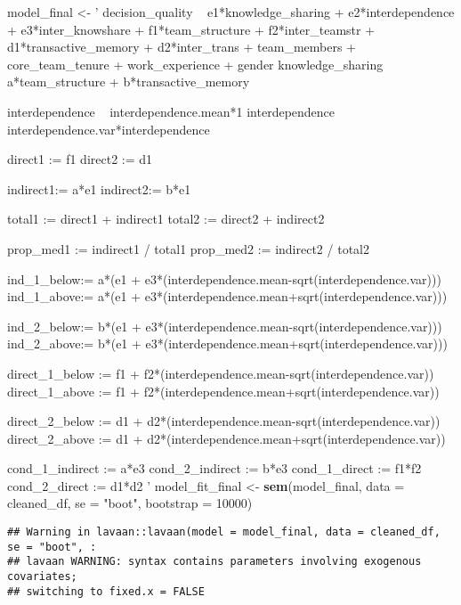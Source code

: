 \documentclass[]{article}
\newenvironment{Shaded}{\begin{snugshade}}{\end{snugshade}}
\newcommand{\DataTypeTok}[1]{\textcolor[rgb]{0.13,0.29,0.53}{#1}}
\newcommand{\DecValTok}[1]{\textcolor[rgb]{0.00,0.00,0.81}{#1}}
\newcommand{\KeywordTok}[1]{\textcolor[rgb]{0.13,0.29,0.53}{\textbf{#1}}}
\newcommand{\NormalTok}[1]{#1}
\newcommand{\StringTok}[1]{\textcolor[rgb]{0.31,0.60,0.02}{#1}}
\begin{document}
\begin{Shaded}
\begin{Highlighting}[]
\NormalTok{model_final <-}\StringTok{ '}
\StringTok{decision_quality ~ e1*knowledge_sharing + e2*interdependence + e3*inter_knowshare + f1*team_structure + f2*inter_teamstr + d1*transactive_memory + d2*inter_trans + team_members + core_team_tenure + work_experience + gender}
\StringTok{knowledge_sharing ~ a*team_structure + b*transactive_memory}

\StringTok{interdependence ~ interdependence.mean*1}
\StringTok{interdependence ~~ interdependence.var*interdependence}

\StringTok{direct1 := f1}
\StringTok{direct2 := d1}

\StringTok{indirect1:= a*e1}
\StringTok{indirect2:= b*e1}

\StringTok{total1 := direct1 + indirect1}
\StringTok{total2 := direct2 + indirect2}

\StringTok{prop_med1 := indirect1 / total1}
\StringTok{prop_med2 := indirect2 / total2}

\StringTok{ind_1_below:= a*(e1 + e3*(interdependence.mean-sqrt(interdependence.var)))}
\StringTok{ind_1_above:= a*(e1 + e3*(interdependence.mean+sqrt(interdependence.var)))}

\StringTok{ind_2_below:= b*(e1 + e3*(interdependence.mean-sqrt(interdependence.var)))}
\StringTok{ind_2_above:= b*(e1 + e3*(interdependence.mean+sqrt(interdependence.var)))}


\StringTok{direct_1_below := f1 + f2*(interdependence.mean-sqrt(interdependence.var))}
\StringTok{direct_1_above := f1 + f2*(interdependence.mean+sqrt(interdependence.var))}

\StringTok{direct_2_below := d1 + d2*(interdependence.mean-sqrt(interdependence.var))}
\StringTok{direct_2_above := d1 + d2*(interdependence.mean+sqrt(interdependence.var))}

\StringTok{cond_1_indirect := a*e3}
\StringTok{cond_2_indirect := b*e3}
\StringTok{cond_1_direct := f1*f2}
\StringTok{cond_2_direct := d1*d2}
\StringTok{'}
\NormalTok{model_fit_final <-}\StringTok{ }\KeywordTok{sem}\NormalTok{(model_final, }\DataTypeTok{data =}\NormalTok{ cleaned_df, }\DataTypeTok{se =} \StringTok{"boot"}\NormalTok{, }\DataTypeTok{bootstrap =} \DecValTok{10000}\NormalTok{)}
\end{Highlighting}
\end{Shaded}

\begin{verbatim}
## Warning in lavaan::lavaan(model = model_final, data = cleaned_df, se = "boot", :
## lavaan WARNING: syntax contains parameters involving exogenous covariates;
## switching to fixed.x = FALSE
\end{verbatim}
\end{document}
